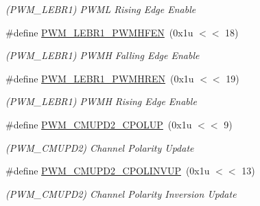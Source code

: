 \begin{DoxyCompactItemize}
\begin{DoxyCompactList}\small\item\em (P\+W\+M\+\_\+\+L\+E\+B\+R1) P\+W\+ML Rising Edge Enable \end{DoxyCompactList}\item 
\mbox{\label{group__SAMV71__PWM_ga3097a80df30369f61b77e3759b2fb168}} 
\#define \mbox{\hyperlink{group__SAMV71__PWM_ga3097a80df30369f61b77e3759b2fb168}{P\+W\+M\+\_\+\+L\+E\+B\+R1\+\_\+\+P\+W\+M\+H\+F\+EN}}~(0x1u $<$$<$ 18)
\begin{DoxyCompactList}\small\item\em (P\+W\+M\+\_\+\+L\+E\+B\+R1) P\+W\+MH Falling Edge Enable \end{DoxyCompactList}\item 
\mbox{\label{group__SAMV71__PWM_ga666994d0422c9658261cb2ba94bda345}} 
\#define \mbox{\hyperlink{group__SAMV71__PWM_ga666994d0422c9658261cb2ba94bda345}{P\+W\+M\+\_\+\+L\+E\+B\+R1\+\_\+\+P\+W\+M\+H\+R\+EN}}~(0x1u $<$$<$ 19)
\begin{DoxyCompactList}\small\item\em (P\+W\+M\+\_\+\+L\+E\+B\+R1) P\+W\+MH Rising Edge Enable \end{DoxyCompactList}\item 
\mbox{\label{group__SAMV71__PWM_ga5dff80eff38ba41b19437319c77f17b1}} 
\#define \mbox{\hyperlink{group__SAMV71__PWM_ga5dff80eff38ba41b19437319c77f17b1}{P\+W\+M\+\_\+\+C\+M\+U\+P\+D2\+\_\+\+C\+P\+O\+L\+UP}}~(0x1u $<$$<$ 9)
\begin{DoxyCompactList}\small\item\em (P\+W\+M\+\_\+\+C\+M\+U\+P\+D2) Channel Polarity Update \end{DoxyCompactList}\item 
\mbox{\label{group__SAMV71__PWM_ga41b747b7dce5a1fc7f53615b8965d928}} 
\#define \mbox{\hyperlink{group__SAMV71__PWM_ga41b747b7dce5a1fc7f53615b8965d928}{P\+W\+M\+\_\+\+C\+M\+U\+P\+D2\+\_\+\+C\+P\+O\+L\+I\+N\+V\+UP}}~(0x1u $<$$<$ 13)
\begin{DoxyCompactList}\small\item\em (P\+W\+M\+\_\+\+C\+M\+U\+P\+D2) Channel Polarity Inversion Update \end{DoxyCompactList}\item 
\mbox{\label{group__SAMV71__PWM_ga2b403ea09b3a0706ab8857a1ddd7a841}} 

\end{DoxyCompactItemize}
